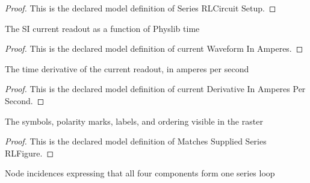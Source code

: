 \begin{proof}
  This is the declared model definition of Series RLCircuit Setup.
\end{proof}
\begin{definition}
  \label{def:physics:phyx-mini-0882:phyxminiproblems-problemphyxmini0882-currentwaveforminamperes}
  The SI current readout as a function of Physlib time
\end{definition}
\begin{proof}
  This is the declared model definition of current Waveform In Amperes.
\end{proof}
\begin{definition}
  \label{def:physics:phyx-mini-0882:phyxminiproblems-problemphyxmini0882-currentderivativeinamperespersecond}
  The time derivative of the current readout, in amperes per second
\end{definition}
\begin{proof}
  This is the declared model definition of current Derivative In Amperes Per Second.
\end{proof}
\begin{definition}
  \label{def:physics:phyx-mini-0882:phyxminiproblems-problemphyxmini0882-matchessuppliedseriesrlfigure}
  The symbols, polarity marks, labels, and ordering visible in the raster
\end{definition}
\begin{proof}
  This is the declared model definition of Matches Supplied Series RLFigure.
\end{proof}
\begin{definition}
  \label{def:physics:phyx-mini-0882:phyxminiproblems-problemphyxmini0882-matchesseriesrltopology}
  Node incidences expressing that all four components form one series loop
\end{definition}
